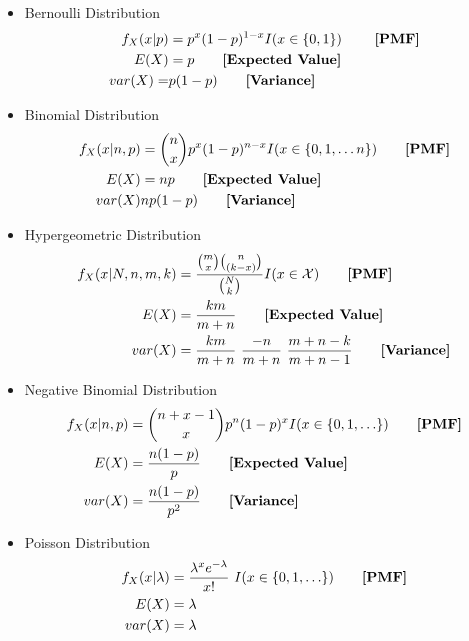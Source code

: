 \documentclass{article}
\begin{document}
  \newpage
  \begin{multicols}{2}
  \begin{itemize}
  \item Bernoulli Distribution
  \begin{align*}
  	f_X(x|p) &= p^x(1-p)^{1-x} I(x \in \{0,1\}) \tag*{ \textbf{[PMF]}}\\
  	E(X) &=p\tag*{\textbf{[Expected Value]}}\\
  	var(X)=&p(1-p)\tag*{\textbf{[Variance]}}\\
  \end{align*}
  \item Binomial Distribution
  \begin{align*}
  	f_X(x|n,p) &={n \choose x} p^x (1-p)^{n-x} I(x \in \{0,1,\ldots n\})\tag*{\textbf{[PMF]}}\\
  	E(X) &= np \tag*{\textbf{[Expected Value]}}\\
	  var(X) & np(1-p)\tag*{\textbf{[Variance]}}\\
  \end{align*}
  \item Hypergeometric Distribution
  \begin{align*}
  	f_X(x|N,n,m,k) &=\frac{{m \choose x}{n \choose (k-x)}}{{N \choose k}}  I(x \in \mathcal{X})\tag*{\textbf{[PMF]}}\\
  	E(X) &= \frac{km}{m+n}\tag*{\textbf{[Expected Value]}}\\
	  var(X) &= \frac{km}{m+n} ~ \frac{-n}{m+n} ~ \frac{m+n-k}{m+n-1} \tag*{\textbf{[Variance]}}\\
  \end{align*}
  \item Negative Binomial Distribution
  \begin{align*}
  	f_X(x|n,p) &={{n+x-1} \choose {x}} p^n (1-p)^{x} I(x \in \{0,1,\ldots\})\tag*{\textbf{[PMF]}}\\
  	E(X) &= \frac{n(1-p)}{p}   \tag*{\textbf{[Expected Value]}}\\
	  var(X) &= \frac{n(1-p)}{p^2} \tag*{\textbf{[Variance]}}\\
  \end{align*}
  \item Poisson Distribution
  \begin{align*}
  	f_X(x|\lambda ) &= \frac{\lambda^x e^{-\lambda}}{x!}~ I(x \in \{0,1,\ldots\}) \tag*{\textbf{[PMF]}}\\
    E(X) &= \lambda\\
    var(X) &= \lambda\\

\end{align*}
\end{itemize}
\end{multicols}
\end{document}
